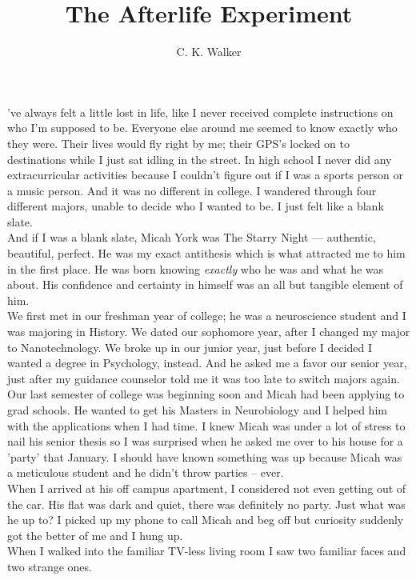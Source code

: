 \documentclass[a5paper]{scrartcl}
\title{The Afterlife Experiment}
\author{C. K. Walker}
\begin{document}
\maketitle

've always felt a little lost in life, like I never received complete instructions on who I'm supposed to be. Everyone else around me seemed to know exactly who they were. Their lives would fly right by me; their GPS's locked on to destinations while I just sat idling in the street. In high school I never did any extracurricular activities because I couldn't figure out if I was a sports person or a music person. And it was no different in college. I wandered through four different majors, unable to decide who I wanted to be. I just felt like a blank slate.\\
And if I was a blank slate, Micah York was The Starry Night --- authentic, beautiful, perfect. He was my exact antithesis which is what attracted me to him in the first place. He was born knowing \textit{exactly} who he was and what he was about. His confidence and certainty in himself was an all but tangible element of him.\\
We first met in our freshman year of college; he was a neuroscience student and I was majoring in History. We dated our sophomore year, after I changed my major to Nanotechnology. We broke up in our junior year, just before I decided I wanted a degree in Psychology, instead. And he asked me a favor our senior year, just after my guidance counselor told me it was too late to switch majors again.\\
Our last semester of college was beginning soon and Micah had been applying to grad schools. He wanted to get his Masters in Neurobiology and I helped him with the applications when I had time. I knew Micah was under a lot of stress to nail his senior thesis so I was surprised when he asked me over to his house for a 'party' that January. I should have known something was up because Micah was a meticulous student and he didn't throw parties – ever.\\
When I arrived at his off campus apartment, I considered not even getting out of the car. His flat was dark and quiet, there was definitely no party. Just what was he up to? I picked up my phone to call Micah and beg off but curiosity suddenly got the better of me and I hung up.\\
When I walked into the familiar TV-less living room I saw two familiar faces and two strange ones.\\
\end{document}
